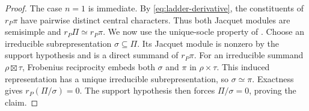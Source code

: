 \documentclass[10pt,a4paper]{article}
\newtheorem{lemma}[theorem]{Lemma}
\theoremstyle{definition}
\theoremstyle{remark}
\numberwithin{equation}{section}
\begin{document}
\begin{proof}
The case $n=1$ is immediate. By \eqref{eq:ladder-derivative}, the
constituents of $r_P\pi$ have pairwise distinct central characters.
Thus both Jacquet modules are semisimple and $r_P\Pi\simeq r_P\pi$.
We now use the
unique-socle property of \cite[Theorem~5.6]{Minguez2009}.
Choose an irreducible subrepresentation $\sigma\subseteq\Pi$.
Its Jacquet module is nonzero by the support hypothesis and is a
direct summand of $r_P\pi$. For an irreducible summand
$\rho\boxtimes\tau$, Frobenius reciprocity embeds both $\sigma$
and $\pi$ in $\rho\times\tau$. This induced representation has a
unique irreducible subrepresentation, so $\sigma\simeq\pi$.
Exactness gives $r_P(\Pi/\sigma)=0$. The support hypothesis then
forces $\Pi/\sigma=0$, proving the claim.
\end{proof}
\end{document}

